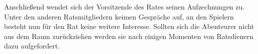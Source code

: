 


Anschließend wendet sich der Vorsitzende des Rates seinen Aufzechnungen zu. Unter den anderen Ratsmitgliedern keimen Gespräche auf, an den Spielern besteht nun für den Rat keine weitere Interesse. Sollten sich die Abenteurer nicht aus dem Raum zurückziehen werden sie nach einigen Momenten von Ratsdienern dazu aufgefordert.
